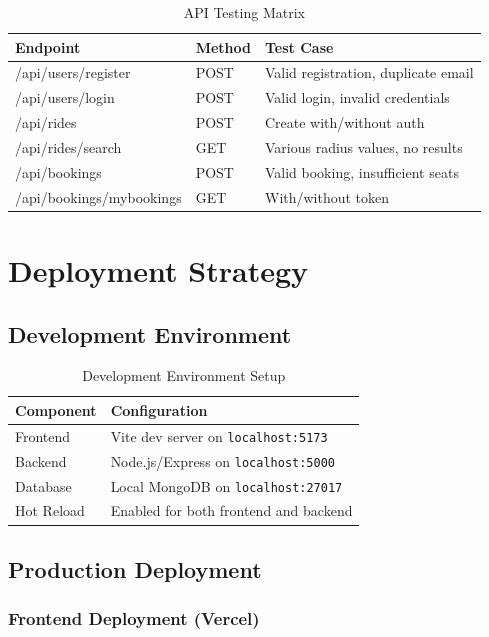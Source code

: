 \documentclass[12pt,a4paper]{article}
\begin{document}
\begin{table}[H]
\centering
\begin{tabular}{|l|l|p{6cm}|}
\hline
\textbf{Endpoint} & \textbf{Method} & \textbf{Test Case} \\
\hline
/api/users/register & POST & Valid registration, duplicate email \\
/api/users/login & POST & Valid login, invalid credentials \\
/api/rides & POST & Create with/without auth \\
/api/rides/search & GET & Various radius values, no results \\
/api/bookings & POST & Valid booking, insufficient seats \\
/api/bookings/mybookings & GET & With/without token \\
\hline
\end{tabular}
\caption{API Testing Matrix}
\end{table}

\newpage

\section{Deployment Strategy}

\subsection{Development Environment}

\begin{table}[H]
\centering
\begin{tabular}{|l|l|}
\hline
\textbf{Component} & \textbf{Configuration} \\
\hline
Frontend & Vite dev server on \texttt{localhost:5173} \\
Backend & Node.js/Express on \texttt{localhost:5000} \\
Database & Local MongoDB on \texttt{localhost:27017} \\
Hot Reload & Enabled for both frontend and backend \\
\hline
\end{tabular}
\caption{Development Environment Setup}
\end{table}

\subsection{Production Deployment}

\subsubsection{Frontend Deployment (Vercel)}
\end{document}
